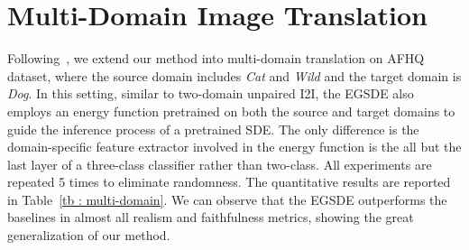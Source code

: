 \documentclass{article}
\begin{document}
\section{Multi-Domain Image Translation}
\label{sec:multi-domain}
    Following~\cite{choi2021ilvr}, we extend our method into multi-domain translation on AFHQ dataset, where the source domain includes \emph{Cat} and \emph{Wild} and the target domain is \emph{Dog}. In this setting, similar to two-domain unpaired I2I, the EGSDE also employs an energy function pretrained on both the source and target domains to guide the inference process of a pretrained SDE. The only difference is the domain-specific feature extractor  involved in the energy function is the all but the last layer of a three-class classifier rather than two-class. All experiments are repeated 5 times to eliminate randomness. The quantitative results are reported in Table~\ref{tb : multi-domain}. We can observe that the EGSDE outperforms the baselines in almost all realism and faithfulness metrics, showing the great generalization of our method.
\end{document}
